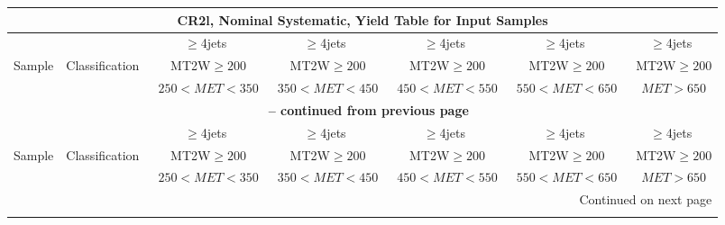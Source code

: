 \documentclass{article}
\begin{document}
\begin{longtable}{|l|c|c|c|c|c|c|} 
 
\multicolumn{7}{c}{ CR2l, Nominal Systematic, Yield Table for Input Samples }\\* \hline 
 &  & $\ge$4jets  & $\ge$4jets  & $\ge$4jets  & $\ge$4jets  & $\ge$4jets \\* 
Sample & Classification  & ~MT2W$\ge200$  & ~MT2W$\ge200$  & ~MT2W$\ge200$  & ~MT2W$\ge200$  & ~MT2W$\ge200$ \\* 
 &  & ~$250<MET<350$  & ~$350<MET<450$  & ~$450<MET<550$  & ~$550<MET<650$  & ~$MET>650$ \\* 
\hline \hline 
\endfirsthead 
 
\multicolumn{7}{c}{{\bfseries \tablename\ \thetable{} -- continued from previous page}}\\* \hline 
 &  & $\ge$4jets  & $\ge$4jets  & $\ge$4jets  & $\ge$4jets  & $\ge$4jets \\* 
Sample & Classification  & ~MT2W$\ge200$  & ~MT2W$\ge200$  & ~MT2W$\ge200$  & ~MT2W$\ge200$  & ~MT2W$\ge200$ \\* 
 &  & ~$250<MET<350$  & ~$350<MET<450$  & ~$450<MET<550$  & ~$550<MET<650$  & ~$MET>650$ \\* 
\hline \hline 
\endhead 
 
\multicolumn{7}{|r|}{{Continued on next page}}\\* \hline 
\endfoot 
 
 
\endlastfoot 
 

\end{longtable}
\end{document}

